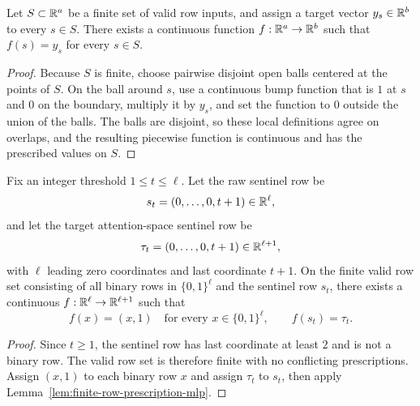 \begin{lemma}
  \label{lem:finite-row-prescription-mlp}
  Let $S\subset\mathbb{R}^a$ be a finite set of valid row inputs, and assign a target
  vector $y_s\in\mathbb{R}^b$ to every $s\in S$.  There exists a continuous function
  $f:\mathbb{R}^a\to\mathbb{R}^b$ such that $f(s)=y_s$ for every $s\in S$.
\end{lemma}
\begin{proof}
  Because $S$ is finite, choose pairwise disjoint open balls centered at the
  points of $S$.  On the ball around $s$, use a continuous bump function that
  is $1$ at $s$ and $0$ on the boundary, multiply it by $y_s$, and set the
  function to $0$ outside the union of the balls.  The balls are disjoint, so
  these local definitions agree on overlaps, and the resulting piecewise
  function is continuous and has the prescribed values on $S$.
\end{proof}

\begin{lemma}
  \label{lem:append-end-token-mlp}
  Fix an integer threshold $1\leq t\leq\ell$.  Let the raw sentinel row be
  \[
    s_t=(0,\ldots,0,t+1)\in\mathbb{R}^\ell,
  \]
  and let the target attention-space sentinel row be
  \[
    \tau_t=(0,\ldots,0,t+1)\in\mathbb{R}^{\ell+1},
  \]
  with $\ell$ leading zero coordinates and last coordinate $t+1$.  On the
  finite valid row set consisting of all binary rows in $\{0,1\}^{\ell}$ and
  the sentinel row $s_t$, there exists a continuous
  $f:\mathbb{R}^\ell\to\mathbb{R}^{\ell+1}$ such that
  \[
    f(x)=(x,1)\quad\text{for every }x\in\{0,1\}^{\ell},
    \qquad
    f(s_t)=\tau_t.
  \]
\end{lemma}
\begin{proof}
  Since $t\geq1$, the sentinel row has last coordinate at least $2$ and is not
  a binary row.  The valid row set is therefore finite with no conflicting
  prescriptions.  Assign $(x,1)$ to each binary row $x$ and assign $\tau_t$ to
  $s_t$, then apply Lemma~\ref{lem:finite-row-prescription-mlp}.
\end{proof}

